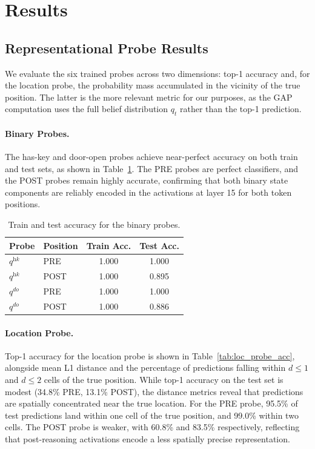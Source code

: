\documentclass[final]{sparreport}
\begin{document}
\section{Results}

\subsection{Representational Probe Results}

We evaluate the six trained probes across two dimensions: top-1 accuracy and, 
for the location probe, the probability mass accumulated in the vicinity of the 
true position. The latter is the more relevant metric for our purposes, as the 
GAP computation uses the full belief distribution $q_t$ rather than the top-1 
prediction.

\paragraph{Binary Probes.}
The has-key and door-open probes achieve near-perfect accuracy on both train and 
test sets, as shown in Table~\ref{tab:binary_probe_acc}. The PRE probes are 
perfect classifiers, and the POST probes remain highly accurate, confirming that 
both binary state components are reliably encoded in the activations at layer 15 
for both token positions.

\begin{table}[h]
\centering
\begin{tabular}{llcc}
\toprule
\textbf{Probe} & \textbf{Position} & \textbf{Train Acc.} & \textbf{Test Acc.} \\
\midrule
$q^{\textit{hk}}$  & PRE  & 1.000 & 1.000 \\
$q^{\textit{hk}}$  & POST & 1.000 & 0.895 \\
$q^{\textit{do}}$  & PRE  & 1.000 & 1.000 \\
$q^{\textit{do}}$  & POST & 1.000 & 0.886 \\
\bottomrule
\end{tabular}
\caption{Train and test accuracy for the binary probes.}
\label{tab:binary_probe_acc}
\end{table}

\paragraph{Location Probe.}
Top-1 accuracy for the location probe is shown in Table~\ref{tab:loc_probe_acc}, 
alongside mean L1 distance and the percentage of predictions falling within 
$d \leq 1$ and $d \leq 2$ cells of the true position. While top-1 accuracy on 
the test set is modest (34.8\% PRE, 13.1\% POST), the distance metrics reveal 
that predictions are spatially concentrated near the true location. For the PRE 
probe, 95.5\% of test predictions land within one cell of the true position, and 
99.0\% within two cells. The POST probe is weaker, with 60.8\% and 83.5\% 
respectively, reflecting that post-reasoning activations encode a less spatially 
precise representation.
\end{document}
